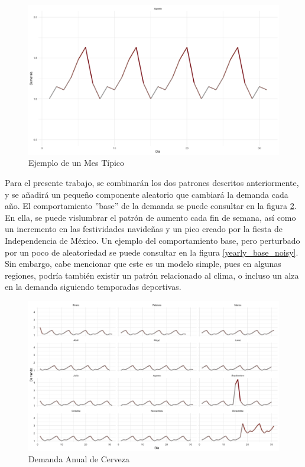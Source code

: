\begin{figure}[ht!]
\caption{Ejemplo de un Mes T\'ipico}
\label{weekly_base}
\includegraphics[width=12cm]{tesis_tex/figs/monthly_customer_demand_ggplot.png}
\centering
\end{figure}

Para el presente trabajo, se combinar\'an los dos patrones descritos anteriormente, y se a\~nadir\'a un peque\~no componente aleatorio que cambiar\'a la demanda cada a\~no. El comportamiento ''base'' de la demanda se puede consultar en la figura \ref{yearly_base}. En ella, se puede vislumbrar el patr\'on de aumento cada fin de semana, as\'i como un incremento en las festividades navide\~nas y un pico creado por la fiesta de Independencia de M\'exico. Un ejemplo del comportamiento base, pero perturbado por un poco de aleatoriedad se puede consultar en la figura \ref{yearly_base_noisy}. Sin embargo, cabe mencionar que este es un modelo simple, pues en algunas regiones, podr\'ia tambi\'en existir un patr\'on relacionado al clima, o incluso un alza en la demanda siguiendo temporadas deportivas. \\

\begin{figure}[ht!]
\caption{Demanda Anual de Cerveza}
\label{yearly_base}
\includegraphics[width=13cm]{tesis_tex/figs/monthly_demand_ggplot.png}
\centering
\end{figure}

